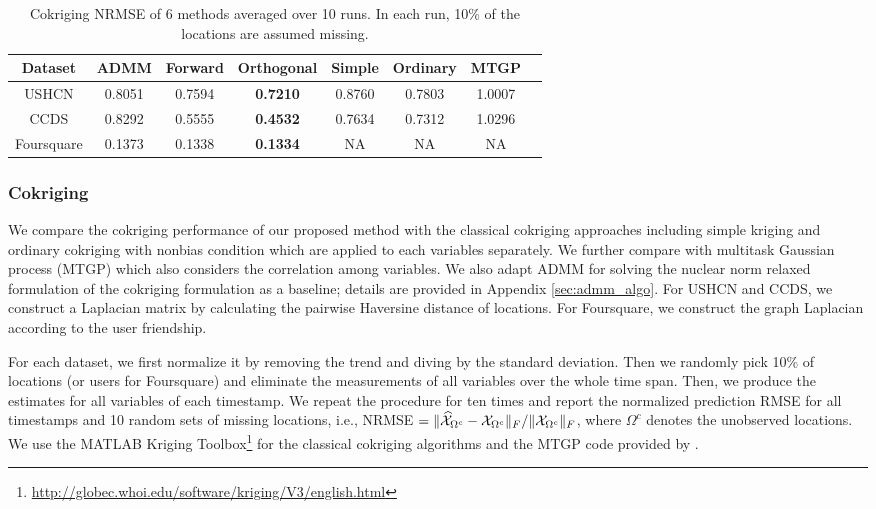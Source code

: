 \begin{table*}[t]
\caption{Cokriging NRMSE of 6 methods averaged over 10 runs. In each run, 10\% of the locations are assumed missing. } %
\label{tab:cokrig_RMSE}
\begin{center}
\begin{tiny}
\begin{sc}
\centering  \footnotesize%
\begin{tabular}{c c c c c c c c} %
\hline
Dataset & ADMM & Forward & Orthogonal  & Simple& Ordinary& MTGP \\
\hline
USHCN  &  0.8051 & 0.7594 & \textbf{0.7210}&  0.8760& 0.7803 & 1.0007 \\
CCDS & 0.8292 & 0.5555& \textbf{0.4532} & 0.7634 & 0.7312 & 1.0296 \\
Foursquare & 0.1373 & 0.1338& \textbf{0.1334} & NA & NA & NA \\
\hline
\end{tabular}
\end{sc}
\end{tiny}
\end{center}
\vspace{-0.25in}
\end{table*}

\subsubsection{Cokriging}
We compare the cokriging performance of our proposed method with the classical cokriging approaches including simple kriging and ordinary cokriging with nonbias condition \cite{isaaks2011applied} which are applied to each variables separately. We further compare with multitask Gaussian process (MTGP) \cite{bonilla2007multi} which also considers the correlation among variables. We also adapt ADMM for solving the nuclear norm relaxed formulation of the cokriging formulation as a baseline; details are provided in Appendix \ref{sec:admm_algo}. For USHCN and CCDS, we construct a Laplacian matrix by calculating the pairwise Haversine distance of locations. For Foursquare, we construct the graph Laplacian according to the user friendship.

For each dataset, we first normalize it by removing the trend and diving by the standard deviation. Then we randomly pick 10\% of locations (or users for Foursquare) and eliminate the measurements of all variables over the whole time span. Then, we produce the estimates for all variables of each timestamp. We repeat the procedure for ten times and report the normalized prediction  RMSE for all timestamps and 10 random sets of missing locations, i.e., NRMSE $=\|\widehat{{\mathcal X}}_{\Omega^c} - {\mathcal X}_{\Omega^c}\|_F/\|{\mathcal X}_{\Omega^c}\|_F$, where $\Omega^c$ denotes the unobserved locations. We use the  MATLAB Kriging Toolbox\footnote{\url{ http://globec.whoi.edu/software/kriging/V3/english.html}} for the classical cokriging algorithms and the MTGP code provided by \cite{bonilla2007multi}. 

